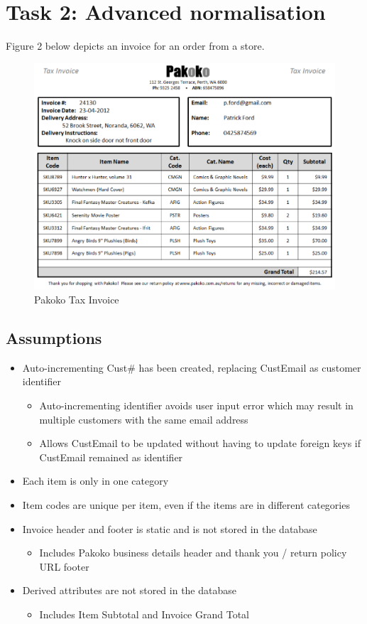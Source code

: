 \newpage
\section{Task 2: Advanced normalisation}

Figure 2 below depicts an invoice for an order from a store.

\begin{figure}[H]
\centering
\caption{Pakoko Tax Invoice}
\includegraphics[scale=0.75]{./img/task2.pdf}
\end{figure}

\subsection*{Assumptions}

\begin{itemize}
\item Auto-incrementing Cust\# has been created, replacing CustEmail as customer identifier
	\begin{itemize}
	\item Auto-incrementing identifier avoids user input error which may result in multiple customers with the same email address
	\item Allows CustEmail to be updated without having to update foreign keys if CustEmail remained as identifier
	\end{itemize}
\item Each item is only in one category
\item Item codes are unique per item, even if the items are in different categories
\item Invoice header and footer is static and is not stored in the database
	\begin{itemize}
	\item Includes Pakoko business details header and thank you / return policy URL footer
	\end{itemize}
\item Derived attributes are not stored in the database
	\begin{itemize}
	\item Includes Item Subtotal and Invoice Grand Total
	\end{itemize}
\end{itemize}

